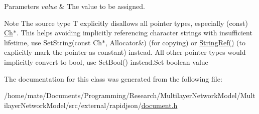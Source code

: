 \begin{DoxyParams}{Parameters}
{\em value} & The value to be assigned.\\
\hline
\end{DoxyParams}
\begin{DoxyNote}{Note}
The source type {\ttfamily T} explicitly disallows all pointer types, especially ({\ttfamily const}) \hyperlink{classGenericValue_ade0e0ce64ccd5d852da57a35e720bafb}{Ch}$\ast$. This helps avoiding implicitly referencing character strings with insufficient lifetime, use Set\+String(const Ch$\ast$, Allocator\&) (for copying) or \hyperlink{document_8h_aa6b9fd9f6aa49405a574c362ba9af6b5}{String\+Ref()} (to explicitly mark the pointer as constant) instead. All other pointer types would implicitly convert to {\ttfamily bool}, use Set\+Bool() instead.\+Set boolean value 
\end{DoxyNote}


The documentation for this class was generated from the following file\+:\begin{DoxyCompactItemize}
\item 
/home/mate/\+Documents/\+Programming/\+Research/\+Multilayer\+Network\+Model/\+Multilayer\+Network\+Model/src/external/rapidjson/\hyperlink{document_8h}{document.\+h}\end{DoxyCompactItemize}

